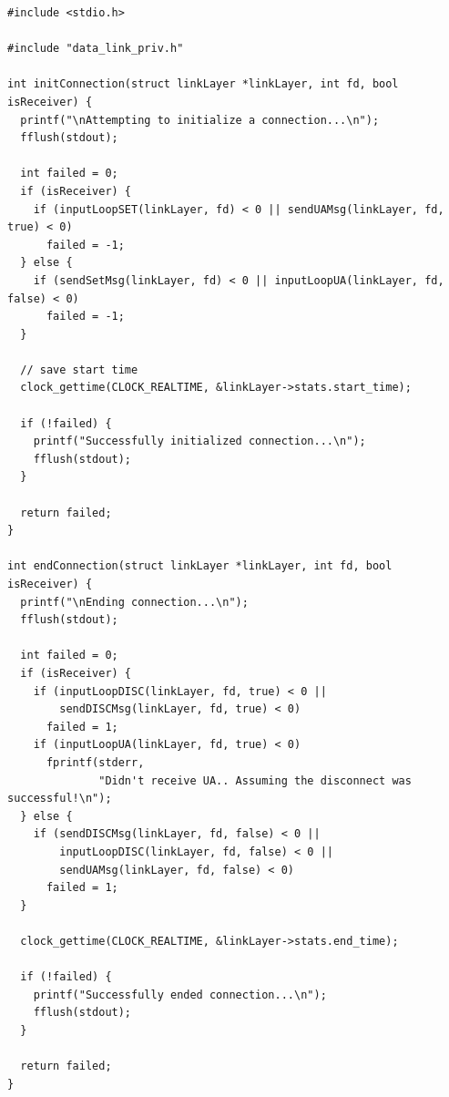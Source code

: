 \documentclass[11pt]{report}
\begin{document}
\begin{lstlisting}
#include <stdio.h>

#include "data_link_priv.h"

int initConnection(struct linkLayer *linkLayer, int fd, bool isReceiver) {
  printf("\nAttempting to initialize a connection...\n");
  fflush(stdout);

  int failed = 0;
  if (isReceiver) {
    if (inputLoopSET(linkLayer, fd) < 0 || sendUAMsg(linkLayer, fd, true) < 0)
      failed = -1;
  } else {
    if (sendSetMsg(linkLayer, fd) < 0 || inputLoopUA(linkLayer, fd, false) < 0)
      failed = -1;
  }

  // save start time
  clock_gettime(CLOCK_REALTIME, &linkLayer->stats.start_time);

  if (!failed) {
    printf("Successfully initialized connection...\n");
    fflush(stdout);
  }

  return failed;
}

int endConnection(struct linkLayer *linkLayer, int fd, bool isReceiver) {
  printf("\nEnding connection...\n");
  fflush(stdout);

  int failed = 0;
  if (isReceiver) {
    if (inputLoopDISC(linkLayer, fd, true) < 0 ||
        sendDISCMsg(linkLayer, fd, true) < 0)
      failed = 1;
    if (inputLoopUA(linkLayer, fd, true) < 0)
      fprintf(stderr,
              "Didn't receive UA.. Assuming the disconnect was successful!\n");
  } else {
    if (sendDISCMsg(linkLayer, fd, false) < 0 ||
        inputLoopDISC(linkLayer, fd, false) < 0 ||
        sendUAMsg(linkLayer, fd, false) < 0)
      failed = 1;
  }

  clock_gettime(CLOCK_REALTIME, &linkLayer->stats.end_time);

  if (!failed) {
    printf("Successfully ended connection...\n");
    fflush(stdout);
  }

  return failed;
}


\end{lstlisting}
\end{document}
